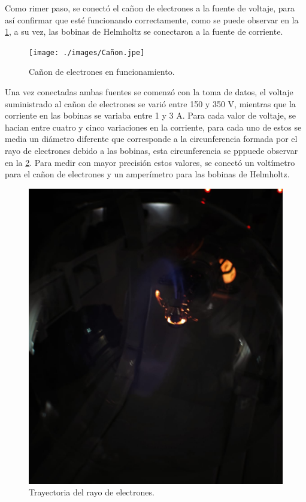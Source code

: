 Como rimer paso, se conectó el cañon de electrones a la fuente de voltaje, para 
así confirmar que esté funcionando correctamente, como se puede observar en la 
\cref{fig:cañon-de-electrones}, a su vez, las bobinas de Helmholtz se 
conectaron a la fuente de corriente.

\begin{figure}[htbp!]
  \centering
  \texttt{[image: ./images/Cañon.jpe]}
  \caption{Cañon de electrones en funcionamiento.}
  \label{fig:cañon-de-electrones}
\end{figure}

Una vez conectadas ambas fuentes se comenzó con la toma de datos, el voltaje 
suministrado al cañon de electrones se varió entre 150 y 350 V,  mientras que 
la corriente en las bobinas se variaba entre 1 y 3 A. Para cada valor de 
voltaje, se hacian entre cuatro y cinco variaciones en la corriente, para cada 
uno de estos se media un diámetro diferente que corresponde a la circunferencia 
formada por el rayo de electrones debido a las bobinas, esta circunferencia se
pppuede observar en la \cref{fig:rayo-de-electrones}. Para medir con mayor 
precisión estos valores, se conectó un voltímetro para el cañon de electrones y
un amperímetro para las bobinas de Helmholtz.

\begin{figure}[htbp!]                                                           
    \centering                                                                  
    \includegraphics[width=0.8\linewidth]{./images/rayo-de-electrones.jpeg}   
    \caption{Trayectoria del rayo de electrones.}                                             
  \label{fig:rayo-de-electrones}                                                          
\end{figure}

